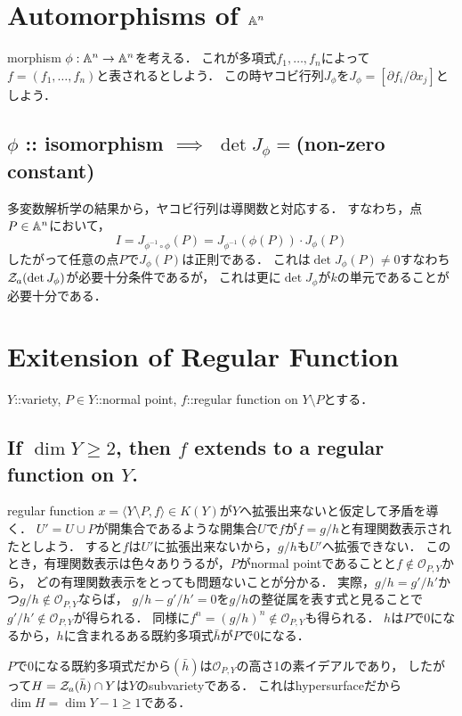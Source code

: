 \documentclass[a4paper]{jsarticle}
\begin{document}
\section{Automorphisms of $\mathbb{A}^n$}
    morphism $\phi:\mathbb{A}^n \to \mathbb{A}^n$を考える．
    これが多項式$f_1, \dots, f_n$によって$f=(f_1, \dots, f_n)$と表されるとしよう．
    この時ヤコビ行列$J_{\phi}$を$J_{\phi}=[\partial f_i/\partial x_j]$としよう．

    \subsection{$\phi$ :: isomorphism $\implies$ $\det J_{\phi}=$(non-zero constant)}
    多変数解析学の結果から，ヤコビ行列は導関数と対応する．
    すなわち，点$P \in \mathbb{A}^n$において，
    \[ I=J_{\phi^{-1} \circ \phi}(P)=J_{\phi^{-1}}(\phi(P)) \cdot J_{\phi}(P) \]
    したがって任意の点$P$で$J_{\phi}(P)$は正則である．
    これは$\det J_{\phi}(P) \neq 0$すなわち$\mathcal{Z}_a(\det J_{\phi})$が必要十分条件であるが，
    これは更に$\det J_{\phi}$が$k$の単元であることが必要十分である．

\section{Exitension of Regular Function}
    $Y$::variety, $P \in Y$::normal point, $f$::regular function on $Y \setminus P$とする．

    \subsection{If $\dim Y \geq 2$, then $f$ extends to a regular function on $Y$.}
    regular function $x=\langle Y \setminus P, f \rangle \in K(Y)$が$Y$へ拡張出来ないと仮定して矛盾を導く．
    $U'=U \cup P$が開集合であるような開集合$U$で$f$が$f=g/h$と有理関数表示されたとしよう．
    すると$f$は$U'$に拡張出来ないから，$g/h$も$U'$へ拡張できない．
    このとき，有理関数表示は色々ありうるが，$P$がnormal pointであることと$f \not \in \mathcal{O}_{P,Y}$から，
    どの有理関数表示をとっても問題ないことが分かる．
    実際，$g/h=g'/h'$かつ$g/h \not \in \mathcal{O}_{P,Y}$ならば，
    $g/h- g'/h'=0$を$g/h$の整従属を表す式と見ることで$g'/h' \not \in \mathcal{O}_{P,Y}$が得られる．
    同様に$f^n=(g/h)^n \not \in \mathcal{O}_{P,Y}$も得られる．
    $h$は$P$で0になるから，$h$に含まれるある既約多項式$\bar{h}$が$P$で0になる．

    $P$で0になる既約多項式だから$(\bar{h})$は$\mathcal{O}_{P,Y}$の高さ1の素イデアルであり，
    したがって$H=\mathcal{Z}_a(\bar{h}) \cap Y$は$Y$のsubvarietyである．
    これはhypersurfaceだから$\dim H=\dim Y-1 \geq 1$である．
\end{document}
